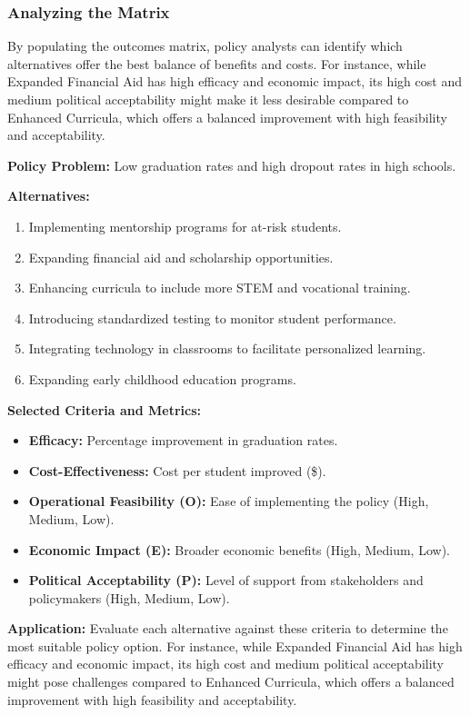 \documentclass{article}
\theoremstyle{definition}
\theoremstyle{plain}
\begin{document}
\subsubsection{Analyzing the Matrix}

By populating the outcomes matrix, policy analysts can identify which alternatives offer the best balance of benefits and costs. For instance, while Expanded Financial Aid has high efficacy and economic impact, its high cost and medium political acceptability might make it less desirable compared to Enhanced Curricula, which offers a balanced improvement with high feasibility and acceptability.

\begin{tcolorbox}[colback=gray!5!white, colframe=gray!75!black, title=Applying Trade-offs to Education Policy Alternatives]

\textbf{Policy Problem:}  
Low graduation rates and high dropout rates in high schools.

\textbf{Alternatives:}

\begin{enumerate}[label=\alph*.]
    \item Implementing mentorship programs for at-risk students.
    \item Expanding financial aid and scholarship opportunities.
    \item Enhancing curricula to include more STEM and vocational training.
    \item Introducing standardized testing to monitor student performance.
    \item Integrating technology in classrooms to facilitate personalized learning.
    \item Expanding early childhood education programs.
\end{enumerate}

\textbf{Selected Criteria and Metrics:}

\begin{itemize}
    \item \textbf{Efficacy:} Percentage improvement in graduation rates.
    \item \textbf{Cost-Effectiveness:} Cost per student improved (\$).
    \item \textbf{Operational Feasibility (O):} Ease of implementing the policy (High, Medium, Low).
    \item \textbf{Economic Impact (E):} Broader economic benefits (High, Medium, Low).
    \item \textbf{Political Acceptability (P):} Level of support from stakeholders and policymakers (High, Medium, Low).
\end{itemize}

\textbf{Application:}  
Evaluate each alternative against these criteria to determine the most suitable policy option. For instance, while Expanded Financial Aid has high efficacy and economic impact, its high cost and medium political acceptability might pose challenges compared to Enhanced Curricula, which offers a balanced improvement with high feasibility and acceptability.

\end{tcolorbox}
\end{document}
